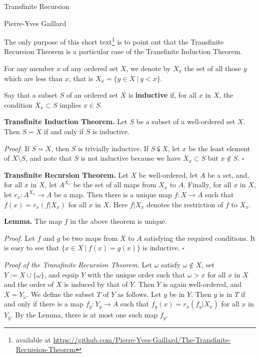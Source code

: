 \documentclass[12pt,letterpaper]{article}
\newcommand{\nn}{\noindent}
\begin{document}
\begin{center}
{\large Transfinite Recursion}\medskip 

{\footnotesize Pierre-Yves Gaillard}
\end{center}

\nn The only purpose of this short text\footnote{available at \url{https://github.com/Pierre-Yves-Gaillard/The-Transfinite-Recursion-Theorem}} is to point out that the Transfinite Recursion Theorem is a particular case of the Transfinite Induction Theorem. 

For any member $x$ of any ordered set $X$, we denote by $X_x$ the set of all those $y$ which are less than $x$, that is $X_x=\{y\in X\ |\ y<x\}$. 

Say that a subset $S$ of an ordered set $X$ is \textbf{inductive} if, for all $x$ in $X$, the condition $X_x\subset S$ implies $x\in S$. 

\nn\textbf{Transfinite Induction Theorem.} Let $S$ be a subset of a well-ordered set $X$. Then $S=X$ if and only if $S$ is inductive. 

\nn\emph{Proof.} If $S=X$, then $S$ is trivially inductive. If $S\subsetneqq X$, let $x$ be the least element of $X\setminus S$, and note that $S$ is not inductive because we have $X_x\subset S$ but $x\notin S$. $\square$

\nn\textbf{Transfinite Recursion Theorem.} Let $X$ be well-ordered, let $A$ be a set, and, for all $x$ in $X$, let $A^{X_x}$ be the set of all maps from $X_x$ to $A$. Finally, for all $x$ in $X$, let $r_x:A^{X_x}\to A$ be a map. Then there is a unique map $f:X\to A$ such that $f(x)=r_x(f|X_x)$ for all $x$ in $X$. Here $f|X_x$ denotes the restriction of $f$ to $X_x$. 

\nn\textbf{Lemma.} The map $f$ in the above theorem is unique. 

\nn\emph{Proof.} Let $f$ and $g$ be two maps from $X$ to $A$ satisfying the required conditions. It is easy to see that $\{x\in X\ |\ f(x)=g(x)\}$ is inductive. $\square$ 

\nn\emph{Proof of the Transfinite Recursion Theorem.} Let $\omega$ satisfy $\omega\notin X$, set $Y:=X\cup\{\omega\}$, and equip $Y$ with the unique order such that $\omega>x$ for all $x$ in $X$ and the order of $X$ is induced by that of $Y$. Then $Y$ is again well-ordered, and $X=Y_\omega$. We define the subset $T$ of $Y$ as follows. Let $y$ be in $Y$. Then $y$ is in $T$ if and only if there is a map $f_y:Y_y\to A$ such that $f_y(x)=r_x(f_y|X_x)$ for all $x$ in $Y_y$. By the Lemma, there is at most one such map $f_y$. 
\end{document}
